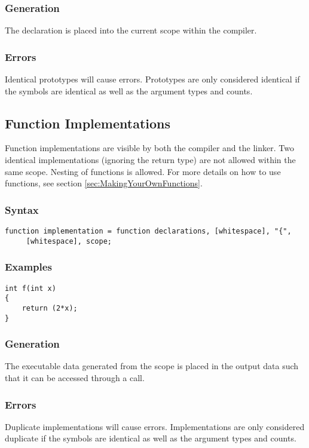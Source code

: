 \documentclass[10pt,a4paper]{article}
\begin{document}
\subsubsection{Generation}
The declaration is placed into the current scope within the compiler.

\subsubsection{Errors}
Identical prototypes will cause errors. Prototypes are only considered identical if the symbols are identical as well as the argument types and counts.

\newpage




\subsection{Function Implementations}
Function implementations are visible by both the compiler and the linker. Two identical implementations (ignoring the return type) are not allowed within the same scope. Nesting of functions is allowed. For more details on how to use functions, see section \ref{sec:MakingYourOwnFunctions}.

\subsubsection{Syntax}
\begin{verbatim}
function implementation = function declarations, [whitespace], "{",
     [whitespace], scope;
\end{verbatim}

\subsubsection{Examples}
\begin{verbatim}
int f(int x)
{
    return (2*x);
}
\end{verbatim}

\subsubsection{Generation}
The executable data generated from the scope is placed in the output data such that it can be accessed through a call.

\subsubsection{Errors}
Duplicate implementations will cause errors. Implementations are only considered duplicate if the symbols are identical as well as the argument types and counts.
\end{document}
